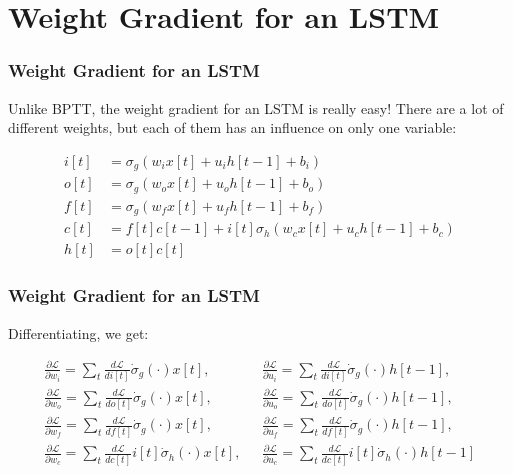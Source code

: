 \documentclass{beamer}
\begin{document}
\section[Weight Gradient]{Weight Gradient for an LSTM}
\setcounter{subsection}{1}

\begin{frame}
  \frametitle{Weight Gradient for an LSTM}

  Unlike BPTT, the weight gradient for an LSTM is really easy!  There
  are a lot of different weights, but each of them has an influence on
  only one variable:
  
  \begin{align*}
    i[t] &=\sigma_g(w_i x[t]+u_i h[t-1]+b_i)\\
    o[t] &=\sigma_g(w_o x[t]+u_o h[t-1]+b_o)\\
    f[t] &=\sigma_g(w_f x[t]+u_f h[t-1]+b_f)\\
    c[t] &=f[t]c[t-1]+i[t]\sigma_h\left(w_cx[t]+u_ch[t-1]+b_c\right)\\
    h[t] &=o[t]c[t]
  \end{align*}
\end{frame}

\begin{frame}
  \frametitle{Weight Gradient for an LSTM}

  Differentiating, we get:
  
  \begin{align*}
    \frac{\partial\mathcal{L}}{\partial w_i}=\sum_t\frac{d\mathcal{L}}{di[t]}\dot\sigma_g(\cdot)x[t],
    &~~~
    \frac{\partial\mathcal{L}}{\partial u_i}=\sum_t\frac{d\mathcal{L}}{di[t]}\dot\sigma_g(\cdot)h[t-1],\\
    \frac{\partial\mathcal{L}}{\partial w_o}=\sum_t\frac{d\mathcal{L}}{do[t]}\dot\sigma_g(\cdot)x[t],
    &~~~
    \frac{\partial\mathcal{L}}{\partial u_o}=\sum_t\frac{d\mathcal{L}}{do[t]}\dot\sigma_g(\cdot)h[t-1],\\
    \frac{\partial\mathcal{L}}{\partial w_f}=\sum_t\frac{d\mathcal{L}}{df[t]}\dot\sigma_g(\cdot)x[t],
    &~~~
    \frac{\partial\mathcal{L}}{\partial u_f}=\sum_t\frac{d\mathcal{L}}{df[t]}\dot\sigma_g(\cdot)h[t-1],\\
    \frac{\partial\mathcal{L}}{\partial w_c}=\sum_t\frac{d\mathcal{L}}{dc[t]}i[t]\dot\sigma_h(\cdot)x[t],
    &~~~
    \frac{\partial\mathcal{L}}{\partial u_c}=\sum_t\frac{d\mathcal{L}}{dc[t]}i[t]\dot\sigma_h(\cdot)h[t-1]
  \end{align*}
\end{frame}
\end{document}
